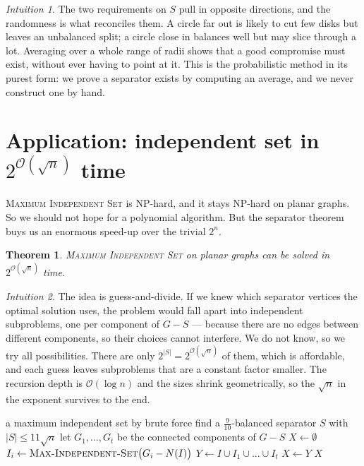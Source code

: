 \documentclass[11pt,a4paper]{article}
\theoremstyle{plain}
\newtheorem{theorem}{Theorem}[section]
\theoremstyle{definition}
\theoremstyle{remark}
\newtheorem*{intuition}{Intuition}
\newcommand{\bigoh}[1]{\mathcal{O}\!\left(#1\right)}
\newcommand{\MIS}{\textsc{Max-Independent-Set}}
\begin{document}
\begin{intuition}
The two requirements on $S$ pull in opposite directions, and the randomness is
what reconciles them. A circle far out is likely to cut few disks but leaves an
unbalanced split; a circle close in balances well but may slice through a lot.
Averaging over a whole range of radii shows that a good compromise must exist,
without ever having to point at it. This is the probabilistic method in its
purest form: we prove a separator exists by computing an average, and we never
construct one by hand.
\end{intuition}

\section{Application: independent set in \texorpdfstring{$2^{\bigoh{\sqrt n}}$}{2^O(sqrt n)} time}\label{sec:mis}

\textsc{Maximum Independent Set} is NP-hard, and it stays NP-hard on planar
graphs. So we should not hope for a polynomial algorithm. But the separator
theorem buys us an enormous speed-up over the trivial $2^n$.

\begin{theorem}\label{thm:mis}
\textsc{Maximum Independent Set} on planar graphs can be solved in
$2^{\bigoh{\sqrt n}}$ time.
\end{theorem}

\begin{intuition}
The idea is guess-and-divide. If we knew which separator vertices the optimal
solution uses, the problem would fall apart into independent subproblems, one
per component of $G - S$ --- because there are no edges between different
components, so their choices cannot interfere. We do not know, so we try all
possibilities. There are only $2^{|S|} = 2^{\bigoh{\sqrt n}}$ of them, which is
affordable, and each guess leaves subproblems that are a constant factor
smaller. The recursion depth is $\bigoh{\log n}$ and the sizes shrink
geometrically, so the $\sqrt{n}$ in the exponent survives to the end.
\end{intuition}

\begin{algorithm}[ht]
\caption{$\MIS(G)$ for planar $G$}
\label{alg:mis}
\begin{algorithmic}[1]
   \Return a maximum independent set by
      brute force \EndIf
  \State find a $\tfrac{9}{10}$-balanced separator $S$ with
         $|S| \le 11\sqrt{n}$ 
  \State let $G_1,\dots,G_t$ be the connected components of $G - S$
  \State $X \gets \emptyset$
      \State $I_i \gets \MIS\bigl(G_i - N(I)\bigr)$
    \EndFor
    \State $Y \gets I \cup I_1 \cup \dots \cup I_t$
     $X \gets Y$ \EndIf
  \EndFor
  \State \Return $X$
\end{algorithmic}
\end{algorithm}
\end{document}
